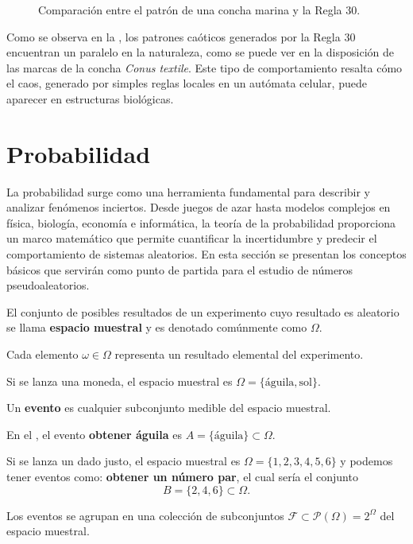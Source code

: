 \documentclass[../Main.tex]{subfiles}
\begin{document}
\begin{figure}[h!]
\hfill
{}
\hfill
{}
\hfill
\caption{Comparación entre el patrón de una concha marina y la Regla 30.}
\label{fig:R30-comp}
\end{figure}

Como se observa en la , los patrones caóticos generados por la Regla 30 encuentran un paralelo en la naturaleza, como se puede ver en la disposición de las marcas de la concha \textit{Conus textile}. Este tipo de comportamiento resalta cómo el caos, generado por simples reglas locales en un autómata celular, puede aparecer en estructuras biológicas.

\section{Probabilidad}
La probabilidad surge como una herramienta fundamental para describir y analizar fenómenos inciertos. Desde juegos de azar hasta modelos complejos en física, biología, economía e informática, la teoría de la probabilidad proporciona un marco matemático que permite cuantificar la incertidumbre y predecir el comportamiento de sistemas aleatorios. En esta sección se presentan los conceptos básicos que servirán como punto de partida para el estudio de números pseudoaleatorios.

\begin{definition}
El conjunto de posibles resultados de un experimento cuyo resultado es aleatorio se llama \textbf{espacio muestral} y es denotado comúnmente como $\Omega$. 
\end{definition}
Cada elemento $\omega \in \Omega$ representa un resultado elemental del experimento. 
\begin{example}
    Si se lanza una moneda, el espacio muestral es $\Omega = \{\text{águila}, \text{sol}\}$.
    \label{ej:moneda}
\end{example}
\begin{definition}
Un \textbf{evento} es cualquier subconjunto medible del espacio muestral.
\end{definition}
En el , el evento \textbf{obtener águila} es $A = \{\text{águila}\}\subset \Omega$. 
\begin{example}
    Si se lanza un dado justo, el espacio muestral es  $\Omega =\{1,2,3,4,5,6\}$ y podemos tener eventos como: \textbf{obtener un número par}, el cual sería el conjunto $$B=\{2,4,6\}\subset \Omega.$$
\end{example}
Los eventos se agrupan en una colección de subconjuntos $\mathcal{F}\subset \mathcal{P}(\Omega)=2^{\Omega}$ del espacio muestral. 
\end{document}
